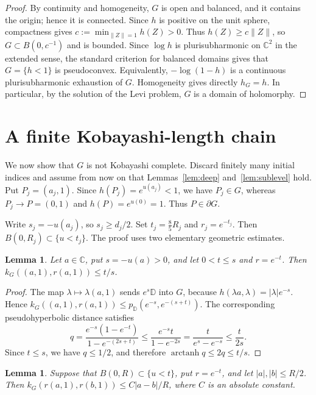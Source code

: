 \documentclass{amsart}
\newcommand{\C}{\mathbb C}
\newcommand{\D}{\mathbb D}
\newtheorem{lemma}[theorem]{Lemma}
\theoremstyle{remark}
\begin{document}
\begin{proof}
By continuity and homogeneity, $G$ is open and balanced, and it contains the origin; hence it is connected. Since $h$ is positive on the unit sphere, compactness gives $c:=\min_{\|Z\|=1}h(Z)>0$. Thus $h(Z)\ge c\|Z\|$, so $G\subset B(0,c^{-1})$ and is bounded. Since $\log h$ is plurisubharmonic on $\C^2$ in the extended sense, the standard criterion for balanced domains gives that $G=\{h<1\}$ is pseudoconvex. Equivalently, $-\log(1-h)$ is a continuous plurisubharmonic exhaustion of $G$. Homogeneity gives directly $h_G=h$. In particular, by the solution of the Levi problem, $G$ is a domain of holomorphy.
\end{proof}

\section{A finite Kobayashi-length chain}

We now show that $G$ is not Kobayashi complete. Discard finitely many initial indices and assume from now on that Lemmas~\ref{lem:deep} and~\ref{lem:sublevel} hold. Put $P_j=(a_j,1)$. Since $h(P_j)=e^{u(a_j)}<1$, we have $P_j\in G$, whereas $P_j\to P=(0,1)$ and $h(P)=e^{u(0)}=1$. Thus $P\in\partial G$.

Write $s_j=-u(a_j)$, so $s_j\ge d_j/2$. Set $t_j=\frac 85R_j$ and $r_j=e^{-t_j}$. Then $B(0,R_j)\subset\{u<t_j\}$. The proof uses two elementary geometric estimates.

\begin{lemma}\label{lem:radial}
Let $a\in\C$, put $s=-u(a)>0$, and let $0<t\le s$ and $r=e^{-t}$. Then $k_G((a,1),r(a,1))\le t/s$.
\end{lemma}

\begin{proof}
The map $\lambda\mapsto\lambda(a,1)$ sends $e^s\D$ into $G$, because $h(\lambda a,\lambda)=|\lambda|e^{-s}$. Hence $k_G((a,1),r(a,1))\le p_{\D}(e^{-s},e^{-(s+t)})$. The corresponding pseudohyperbolic distance satisfies
\[
 q=\frac{e^{-s}(1-e^{-t})}{1-e^{-(2s+t)}}
 \le\frac{e^{-s}t}{1-e^{-2s}}
 =\frac{t}{e^s-e^{-s}}\le\frac{t}{2s}.
\]
Since $t\le s$, we have $q\le1/2$, and therefore $\operatorname{arctanh}q\le2q\le t/s$.
\end{proof}

\begin{lemma}\label{lem:horizontal}
Suppose that $B(0,R)\subset\{u<t\}$, put $r=e^{-t}$, and let $|a|,|b|\le R/2$. Then $k_G(r(a,1),r(b,1))\le C|a-b|/R$, where $C$ is an absolute constant.
\end{lemma}
\end{document}

